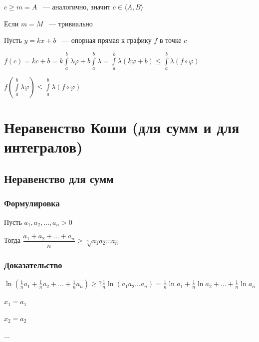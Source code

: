 \documentclass{article}
\begin{document}
            $c \geq m = A$ ~--- аналогично, значит $c \in \langle A, B \rangle$
            
            Если $m = M$ ~--- тривиально
            
            Пусть $y = kx + b$ ~--- опорная прямая к графику $f$ в точке $c$
            
            $f(c) = kc + b = k \int\limits^b_a \lambda \varphi + b \int\limits^b_a \lambda = \int\limits^b_a \lambda(k\varphi + b) \leq \int\limits^b_a \lambda (f \circ \varphi)$
            
            $f\left( \int\limits^b_a \lambda \varphi \right) \leq \int\limits^b_a \lambda (f \circ \varphi)$
            
    \newpage
    
    \section{Неравенство Коши (для сумм и для интегралов)}
    
        \subsection{Неравенство для сумм}
        
            \subsubsection{Формулировка}
            
                Пусть $a_1, a_2, \ldots, a_n > 0$
                
                Тогда $\dfrac{a_1 + a_2 + \ldots + a_n}{n} \geq \sqrt[n]{a_1 a_2 \ldots a_n}$
                
            \subsubsection{Доказательство}
            
                $\ln \left( \frac{1}{n} a_1 + \frac{1}{n} a_2 + \ldots + \frac{1}{n} a_n \right) \geq? \frac{1}{n} \ln(a_1 a_2 \ldots a_n) = \frac{1}{n} \ln{a_1} + \frac{1}{n} \ln{a_2} + \ldots + \frac{1}{n} \ln{a_n}$
                
                $x_1 = a_1$
                
                $x_2 = a_2$
                
                $\ldots$
                
\end{document}
